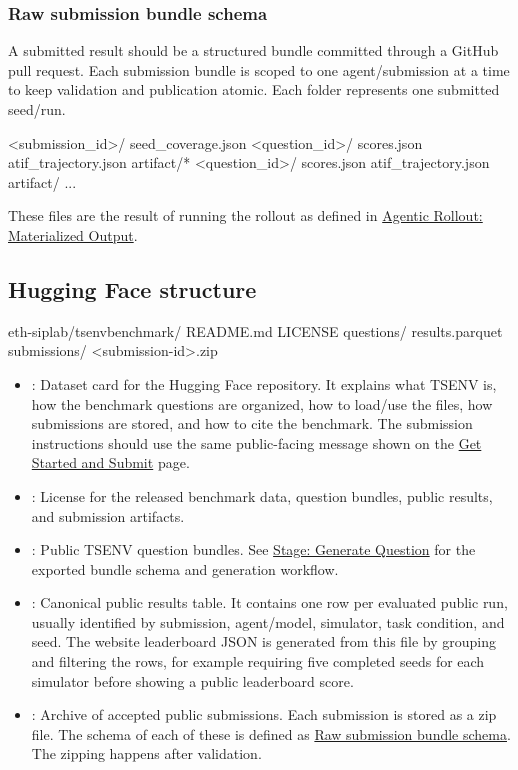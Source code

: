 \documentclass[11pt]{article}
\begin{document}
\label{sec:website-raw-submission-bundle}
\subsubsection*{Raw submission bundle schema}

A submitted result should be a structured bundle committed through a GitHub pull request.
Each submission bundle is scoped to one agent/submission at a time to keep validation and publication atomic.
Each  folder represents one submitted seed/run.

\begin{DocCode}
<submission_id>/
  seed_coverage.json
  <question_id>/
    scores.json
    atif_trajectory.json
    artifact/*
  <question_id>/
    scores.json
    atif_trajectory.json
    artifact/
      ...
\end{DocCode}
These files are the result of running the rollout as defined in \hyperref[sec:agentic-rollout-materialized-output]{Agentic Rollout: Materialized Output}.


\subsection*{Hugging Face structure}
\begin{DocCode}
eth-siplab/tsenvbenchmark/
  README.md
  LICENSE
  questions/
  results.parquet
  submissions/
    <submission-id>.zip
\end{DocCode}
\begin{itemize}
    \item {}: Dataset card for the Hugging Face repository. 
    It explains what TSENV is, how the benchmark questions are organized, how to load/use the files, how submissions are stored, and how to cite the benchmark.
    The submission instructions should use the same public-facing message shown on the \hyperref[sec:website-page-get-started]{Get Started and Submit} page.
    \item {}: License for the released benchmark data, question bundles, public results, and submission artifacts.
    \item {}: Public TSENV question bundles. 
    See \hyperref[docstart:generate_question_stage]{Stage: Generate Question} for the exported bundle schema and generation workflow.
    \item {}: Canonical public results table. 
    It contains one row per evaluated public run, usually identified by submission, agent/model, simulator, task condition, and seed. 
    The website leaderboard JSON is generated from this file by grouping and filtering the rows, for example requiring five completed seeds for each simulator before showing a public leaderboard score.
    \item {}: Archive of accepted public submissions. 
    Each submission is stored as a zip file. 
    The schema of each of these is defined as \hyperref[sec:website-raw-submission-bundle]{Raw submission bundle schema}.
    The zipping happens after validation.
\end{itemize}
\end{document}
